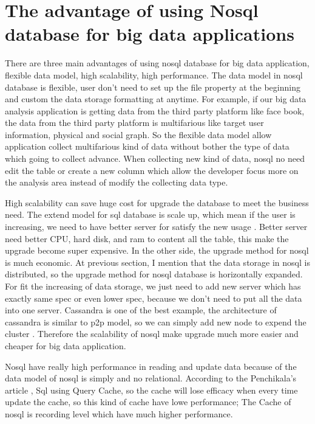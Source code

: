 \documentclass[sigconf]{acmart}
\begin{document}
\section{The advantage of using Nosql database for big data applications}
There are three main advantages of using nosql database for big data application, flexible data model, high scalability, high performance. The data model in nosql database is flexible, user don't need to set up the file property at the beginning and custom the data storage formatting at anytime\cite{adv:3}. For example, if our big data analysis application is getting data from the third party platform like face book, the data from the third party platform is multifarious like target user information, physical and  social graph. So the flexible data model allow application collect multifarious kind of data without bother the type of data which going to collect advance. When collecting new kind of data, nosql no need edit the table or create a new column which allow the developer focus more on the analysis area instead of modify the collecting data type. 

High scalability can save huge cost for upgrade the database to meet the business need. The extend model for sql database is scale up, which mean if the user is increasing, we need to have better server for satisfy the new usage \cite{adv:2}. Better server need better CPU, hard disk, and ram to content all the table, this make the upgrade become super expensive. In the other side, the upgrade method for nosql is much economic. At previous section, I mention that the data storage in nosql is distributed, so the upgrade method for nosql database is horizontally expanded. For fit the increasing of data storage, we just need to add new server which has exactly same spec or even lower spec, because we don't need to put all the data into one server. Cassandra is one of the best example, the architecture of cassandra is similar to p2p model, so we can simply add new node to expend the cluster \cite{adv:1}. Therefore the scalability of nosql make upgrade much more easier and cheaper for big data application.

Nosql have really high performance in reading and update data because of the data model of nosql is simply and no relational. According to the Penchikala's article \cite{adv:05}, Sql using Query Cache, so the cache will lose efficacy when every time update the cache, so this kind of cache have lowe performance; The Cache of nosql is recording level which have much higher performance.
\end{document}
